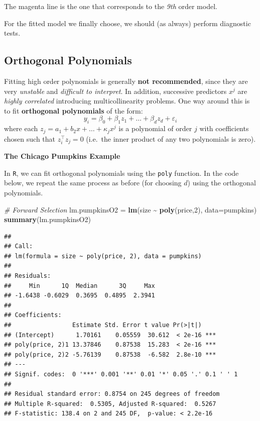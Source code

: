 \documentclass[
]{book}
\newenvironment{Shaded}{\begin{snugshade}}{\end{snugshade}}
\newcommand{\AttributeTok}[1]{\textcolor[rgb]{0.13,0.29,0.53}{#1}}
\newcommand{\CommentTok}[1]{\textcolor[rgb]{0.56,0.35,0.01}{\textit{#1}}}
\newcommand{\DecValTok}[1]{\textcolor[rgb]{0.00,0.00,0.81}{#1}}
\newcommand{\FunctionTok}[1]{\textcolor[rgb]{0.13,0.29,0.53}{\textbf{#1}}}
\newcommand{\NormalTok}[1]{#1}
\newcommand{\OtherTok}[1]{\textcolor[rgb]{0.56,0.35,0.01}{#1}}
\newcommand{\SpecialCharTok}[1]{\textcolor[rgb]{0.81,0.36,0.00}{\textbf{#1}}}
\begin{document}
The magenta line is the one that corresponds to the \emph{9th} order model.

For the fitted model we finally choose, we should (as always) perform diagnostic tests.

\subsection{Orthogonal Polynomials}\label{orthogonal-polynomials}

Fitting high order polynomials is generally \textbf{not recommended}, since they are very \emph{unstable} and \emph{difficult to interpret}. In addition, successive predictors \(x^j\) are \emph{highly correlated} introducing multicollinearity problems. One way around this is to fit \textbf{orthogonal polynomials} of the form:
\[y_i=\beta_0+\beta_1z_1+\ldots+\beta_d z_d+\varepsilon_i\]
where each \(z_j=a_{1} + b_{2} x + \ldots+ \kappa_j x^j\) is a polynomial of order \(j\) with coefficients chosen such that \(z_i^\top z_j=0\) (i.e.~the inner product of any two polynomials is zero).

\textbf{The Chicago Pumpkins Example}

In \texttt{R}, we can fit orthogonal polynomials using the \texttt{poly} function. In the code below, we repeat the same process as before (for choosing \(d\)) using the orthogonal polynomials.

\begin{Shaded}
\begin{Highlighting}[]
\CommentTok{\# Forward Selection}
\NormalTok{lm.pumpkinsO2 }\OtherTok{=}  \FunctionTok{lm}\NormalTok{(size }\SpecialCharTok{\textasciitilde{}} \FunctionTok{poly}\NormalTok{(price,}\DecValTok{2}\NormalTok{), }\AttributeTok{data=}\NormalTok{pumpkins)}
\FunctionTok{summary}\NormalTok{(lm.pumpkinsO2)}
\end{Highlighting}
\end{Shaded}

\begin{verbatim}
## 
## Call:
## lm(formula = size ~ poly(price, 2), data = pumpkins)
## 
## Residuals:
##     Min      1Q  Median      3Q     Max 
## -1.6438 -0.6029  0.3695  0.4895  2.3941 
## 
## Coefficients:
##                 Estimate Std. Error t value Pr(>|t|)    
## (Intercept)      1.70161    0.05559  30.612  < 2e-16 ***
## poly(price, 2)1 13.37846    0.87538  15.283  < 2e-16 ***
## poly(price, 2)2 -5.76139    0.87538  -6.582  2.8e-10 ***
## ---
## Signif. codes:  0 '***' 0.001 '**' 0.01 '*' 0.05 '.' 0.1 ' ' 1
## 
## Residual standard error: 0.8754 on 245 degrees of freedom
## Multiple R-squared:  0.5305, Adjusted R-squared:  0.5267 
## F-statistic: 138.4 on 2 and 245 DF,  p-value: < 2.2e-16
\end{verbatim}
\end{document}
